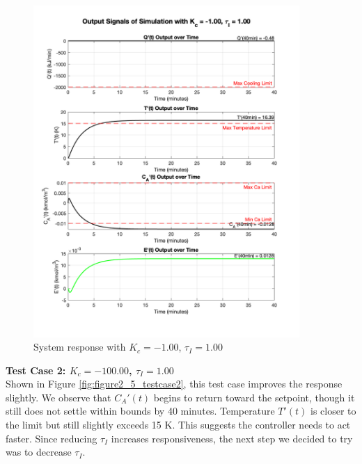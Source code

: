 \documentclass[12pt]{article}
\begin{document}
\begin{enumerate}
\begin{enumerate}
    \begin{figure}[H]
      \centering
      \includegraphics[width=0.900\textwidth]{Figures/figure2_5_testcase1.png}
      \caption{System response with $K_c = -1.00$, $\tau_I = 1.00$}
      \label{fig:figure2_5_testcase1}
    \end{figure}
    
    \clearpage
    \textbf{Test Case 2: $K_c = -100.00$, $\tau_I = 1.00$} \\
    Shown in Figure \ref{fig:figure2_5_testcase2}, this test case improves the response slightly. We observe that $C_A'(t)$ begins to return toward the setpoint, though it still does not settle within bounds by 40 minutes. Temperature $T'(t)$ is closer to the limit but still slightly exceeds 15 K. This suggests the controller needs to act faster. Since reducing $\tau_I$ increases responsiveness, the next step we decided to try was to decrease $\tau_I$.
    

\end{enumerate}
\end{enumerate}
\end{document}
